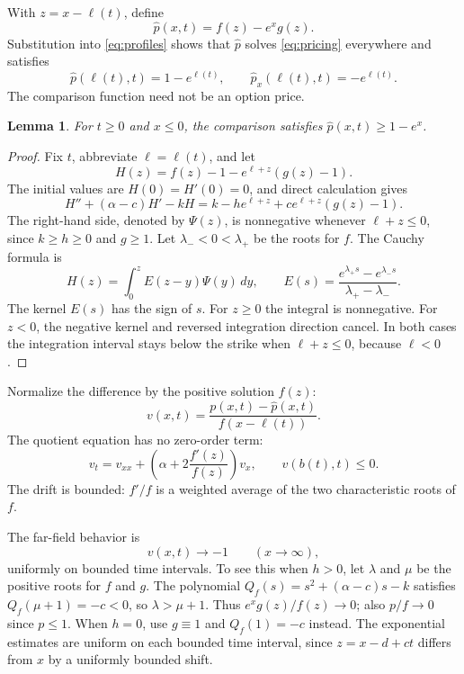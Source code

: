 \documentclass[11pt]{article}
\newtheorem{lemma}[theorem]{Lemma}
\newcommand{\phat}{\widehat p}
\begin{document}
With $z=x-\ell(t)$, define
\begin{equation}\label{eq:comparison}
  \phat(x,t)=f(z)-e^xg(z).
\end{equation}
Substitution into \eqref{eq:profiles} shows that $\phat$ solves
\eqref{eq:pricing} everywhere and satisfies
\[
  \phat(\ell(t),t)=1-e^{\ell(t)},\qquad
  \phat_x(\ell(t),t)=-e^{\ell(t)}.
\]
The comparison function need not be an option price.

\begin{lemma}\label{lem:domination}
For $t\ge0$ and $x\le0$, the comparison satisfies
$\phat(x,t)\ge1-e^x$.
\end{lemma}

\begin{proof}
Fix $t$, abbreviate $\ell=\ell(t)$, and let
\[
  H(z)=f(z)-1-e^{\ell+z}(g(z)-1).
\]
The initial values are $H(0)=H'(0)=0$, and direct calculation gives
\begin{equation}\label{eq:excess}
  H''+(\alpha-c)H'-kH
    =k-he^{\ell+z}+ce^{\ell+z}(g(z)-1).
\end{equation}
The right-hand side, denoted by $\Psi(z)$, is nonnegative whenever
$\ell+z\le0$, since $k\ge h\ge0$ and $g\ge1$.
Let $\lambda_-<0<\lambda_+$ be the roots for $f$. The Cauchy formula is
\[
  H(z)=\int_0^z E(z-y)\Psi(y)\,dy,\qquad
  E(s)=\frac{e^{\lambda_+s}-e^{\lambda_-s}}{\lambda_+-\lambda_-}.
\]
The kernel $E(s)$ has the sign of $s$. For $z\ge0$ the integral is
nonnegative. For $z<0$, the negative kernel and reversed integration
direction cancel. In both cases the integration interval stays below
the strike when $\ell+z\le0$, because $\ell<0$.
\end{proof}

Normalize the difference by the positive solution $f(z)$:
\[
  v(x,t)=\frac{p(x,t)-\phat(x,t)}{f(x-\ell(t))}.
\]
The quotient equation has no zero-order term:
\begin{equation}\label{eq:quotient}
  v_t=v_{xx}+\left(\alpha+2\frac{f'(z)}{f(z)}\right)v_x,
  \qquad v(b(t),t)\le0.
\end{equation}
The drift is bounded: $f'/f$ is a weighted average of the two
characteristic roots of $f$.

The far-field behavior is
\begin{equation}\label{eq:tail}
  v(x,t)\longrightarrow-1\qquad(x\to\infty),
\end{equation}
uniformly on bounded time intervals. To see this when $h>0$, let
$\lambda$ and $\mu$ be the positive roots for $f$ and $g$.
The polynomial $Q_f(s)=s^2+(\alpha-c)s-k$ satisfies
$Q_f(\mu+1)=-c<0$, so $\lambda>\mu+1$.
Thus $e^xg(z)/f(z)\to0$; also $p/f\to0$ since $p\le1$.
When $h=0$, use $g\equiv1$ and $Q_f(1)=-c$ instead.
The exponential estimates are uniform on each bounded time interval,
since $z=x-d+ct$ differs from $x$ by a uniformly bounded shift.
\end{document}
